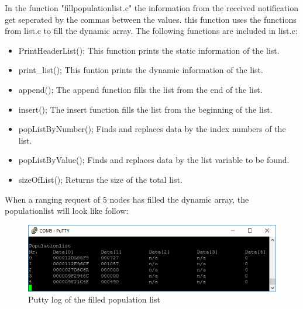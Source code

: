 \documentclass[a4paper, 10pt]{article} %
\begin{document}
In the function "fillpopulationlist.c" the information from the received notification get seperated by the commas between the values. this function uses the functions from list.c to fill the dynamic array. The following functions are included in list.c:

    \begin{itemize}
        \item PrintHeaderList(); This function prints the static information of the list.
        \item print\_list(); This funtion prints the dynamic information of the list.
        \item append(); The append function fills the list from the end of the list.
        \item insert(); The insert function fills the list from the beginning of the list.
        \item popListByNumber(); Finds and replaces data by the index numbers of the list.
        \item popListByValue(); Finds and replaces data by the list variable to be found.
        \item sizeOfList(); Returns the size of the total list.
    \end{itemize}

When a ranging request of 5 nodes has filled the dynamic array, the populationlist will look like follow:
\begin{figure}[H]
  \centering
      \includegraphics[width=\textwidth]{populationlist.png}
  \caption{Putty log of the filled population list}
  \label{list}
\end{figure}






\end{document}
